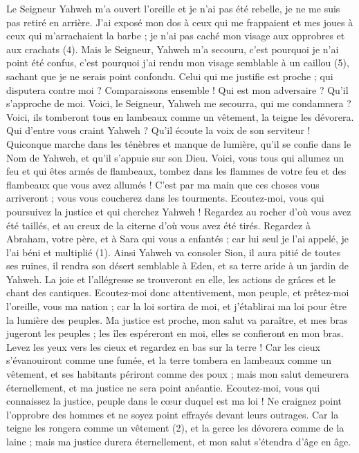\begin{multicols}{2}
{Le Seigneur Yahweh m'a ouvert l'oreille et je n'ai pas été rebelle, je ne me suis pas retiré en arrière.
J'ai exposé mon dos à ceux qui me frappaient et mes joues à ceux qui m’arrachaient la barbe ; je n'ai pas caché mon visage aux opprobres et aux crachats (4).
Mais le Seigneur, Yahweh m'a secouru, c'est pourquoi je n'ai point été confus, c’est pourquoi j'ai rendu mon visage semblable à un caillou (5), sachant que je ne serais point confondu.
Celui qui me justifie est proche ; qui disputera contre moi ? Comparaissons ensemble ! Qui est mon adversaire ? Qu’il s’approche de moi.
Voici, le Seigneur, Yahweh me secourra, qui me condamnera ? Voici, ils tomberont tous en lambeaux comme un vêtement, la teigne les dévorera.
Qui d’entre vous craint Yahweh ? Qu’il écoute la voix de son serviteur ! Quiconque marche dans les ténèbres et manque de lumière, qu’il se confie dans le Nom de Yahweh, et qu'il s'appuie sur son Dieu.
Voici, vous tous qui allumez un feu et qui êtes armés de flambeaux, tombez dans les flammes de votre feu et des flambeaux que vous avez allumés ! C’est par ma main que ces choses vous arriveront ; vous vous coucherez dans les tourments.
\VerseOne{}Ecoutez-moi, vous qui poursuivez la justice et qui cherchez Yahweh ! Regardez au rocher d’où vous avez été taillés, et au creux de la citerne d’où vous avez été tirés.
Regardez à Abraham, votre père, et à Sara qui vous a enfantés ; car lui seul je l'ai appelé, je l'ai béni et multiplié (1).
Ainsi Yahweh va consoler Sion, il aura pitié de toutes ses ruines, il rendra son désert semblable à Eden, et sa terre aride à un jardin de Yahweh. La joie et l'allégresse se trouveront en elle, les actions de grâces et le chant des cantiques.
Ecoutez-moi donc attentivement, mon peuple, et prêtez-moi l'oreille, vous ma nation ; car la loi sortira de moi, et j'établirai ma loi pour être la lumière des peuples.
Ma justice est proche, mon salut va paraître, et mes bras jugeront les peuples ; les îles espéreront en moi, elles se confieront en mon bras.
Levez les yeux vers les cieux et regardez en bas sur la terre ! Car les cieux s'évanouiront comme une fumée, et la terre tombera en lambeaux comme un vêtement, et ses habitants périront comme des poux ; mais mon salut demeurera éternellement, et ma justice ne sera point anéantie.
Ecoutez-moi, vous qui connaissez la justice, peuple dans le cœur duquel est ma loi ! Ne craignez point l'opprobre des hommes et ne soyez point effrayés devant leurs outrages.
Car la teigne les rongera comme un vêtement (2), et la gerce les dévorera comme de la laine ; mais ma justice durera éternellement, et mon salut s’étendra d’âge en âge.
}
\end{multicols}
